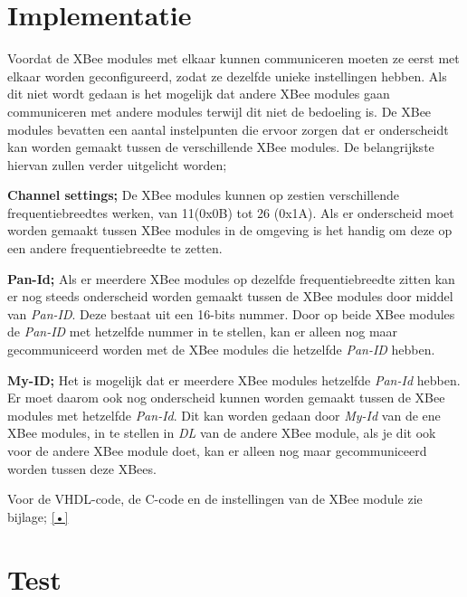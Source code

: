 \documentclass{report}
\begin{document}
\section{Implementatie}
Voordat de XBee modules met elkaar kunnen communiceren moeten ze eerst met elkaar worden geconfigureerd, zodat ze dezelfde unieke instellingen hebben.
Als dit niet wordt gedaan is het mogelijk dat andere XBee modules gaan communiceren met andere modules terwijl dit niet de bedoeling is.
\newline
De XBee modules bevatten een aantal instelpunten die ervoor zorgen dat er onderscheidt kan worden gemaakt tussen de verschillende XBee modules.
De belangrijkste hiervan zullen verder uitgelicht worden;
\newline

\textbf{Channel settings;}
\newline
De XBee modules kunnen op zestien verschillende frequentiebreedtes werken, van 11(0x0B) tot 26 (0x1A).
Als er onderscheid moet worden gemaakt tussen XBee modules in de omgeving is het handig om deze op een andere frequentiebreedte te zetten.
\newline

\textbf{Pan-Id;}
\newline
Als er meerdere XBee modules op dezelfde frequentiebreedte zitten kan er nog steeds onderscheid worden gemaakt tussen de XBee modules door middel van \textit{Pan-ID}.
Deze bestaat uit een 16-bits nummer.
Door op beide XBee modules de \textit{Pan-ID}  met hetzelfde nummer in te stellen, kan er alleen nog maar gecommuniceerd worden met de XBee modules die hetzelfde \textit{Pan-ID} hebben.
\newline

\textbf{My-ID;}
\newline
Het is mogelijk dat er meerdere XBee modules hetzelfde\textit{ Pan-Id} hebben.
Er moet daarom ook nog onderscheid kunnen worden gemaakt tussen de XBee modules met hetzelfde \textit{Pan-Id}.
Dit kan worden gedaan door \textit{My-Id} van de ene XBee modules, in te stellen in \textit{DL} van de andere XBee module, als je dit ook voor de andere XBee module doet, kan er alleen nog maar gecommuniceerd worden tussen deze XBees.

Voor de VHDL-code, de C-code en de instellingen van de XBee module zie bijlage; \ref{•}

\section{Test}
\end{document}
